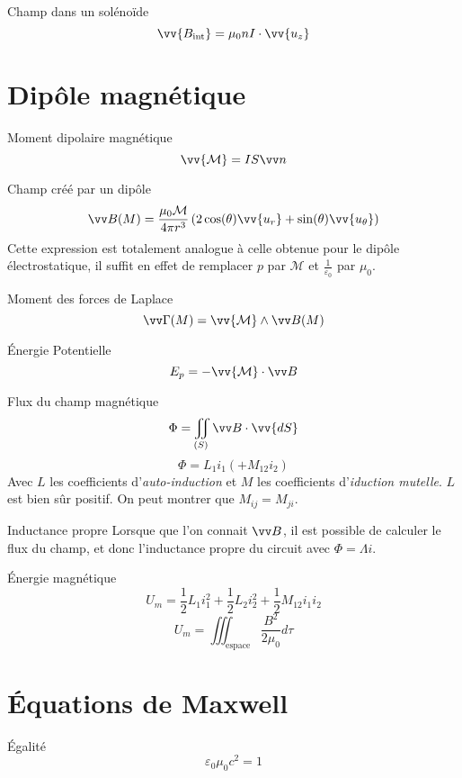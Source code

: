 \documentclass[french, a4paper, 11pt, twocolumn]{article}
\newcommand{\inv}[1]{\dfrac{1}{#1}}
\newcommand{\po}{\left(}         %
\newcommand{\pf}{\right)}        %
\newcommand{\pof}[1]{\po #1 \pf} %
\newcommand{\vect}[1]{\vv{#1}}
\newcommand{\uz}{\vect{u_z}}          %
\newcommand{\ur}{\vect{u_r}}          %
\newcommand{\uth}{\vect{u_\theta}}    %
\begin{document}
\begin{cadre}{Champ dans un solénoïde}
  \[\vv{B_{\text{int}}}=\mu_{0}nI\cdot\uz\]
\end{cadre}

\section{Dipôle magnétique}
\begin{cadre}{Moment dipolaire magnétique}
  \[\vv{\mathcal M} = IS\vv n\]
\end{cadre}

\begin{cadre}{Champ créé par un dipôle}
  \[\vv B(M) = \dfrac{\mu_0\mathcal M}{4\pi r^3}\pof{2\cos(\theta)\ur + \sin(\theta)\uth}\]
  Cette expression est totalement analogue à celle obtenue pour le dipôle électrostatique, il suffit en effet de remplacer \(p\) par \(\mathcal M\) et \(\frac{1}{\varepsilon_{0}}\) par \(\mu_{0}\).
\end{cadre}

\begin{cadre}{Moment des forces de Laplace}
\[\vv\Gamma(M) = \vv{\mathcal M}\wedge \vv B(M)\]
\end{cadre}

\begin{cadre}{Énergie Potentielle}
  \[E_{p} = -\vv{\mathcal M}\cdot \vv B\]
\end{cadre}

\begin{cadre}{Flux du champ magnétique}
  \[\Phi = \iint_{(S)}\vv B\cdot\vv{dS}\]
  \[\Phi = L_{1}i_{1} (+ M_{12} i_{2})\]
  Avec \(L\) les coefficients d'\emph{auto-induction} et \(M\) les coefficients d'\emph{iduction mutelle}.
  \(L\) est bien sûr positif.
  On peut montrer que \(M_{ij} = M_{ji}\).
\end{cadre}

\begin{cadre}{Inductance propre}
  Lorsque que l'on connait \(\vv B\), il est possible de calculer le flux du champ, et donc l'inductance propre du circuit avec \(\Phi =\Lambda i\).
\end{cadre}

\begin{cadre}{Énergie magnétique}
  \[U_{m} = \inv{2}L_{1}i_{1}^{2}+\inv{2}L_{2}i_{2}^{2}+\inv{2}M_{12}i_{1}i_{2}\]
  \[U_{m} = \iiint_{\text{espace}}\dfrac{B^{2}}{2\mu_{0}}d\tau\]
\end{cadre}

\section{Équations de Maxwell}
\begin{cadre}{Égalité}
  \[\varepsilon_{0}\mu_{0}c^{2}=1\]
\end{cadre}
\end{document}
